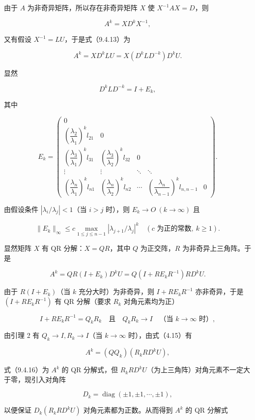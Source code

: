 由于 \(A\) 为非奇异矩阵，所以存在非奇异矩阵 \(X\) 使 \(X^{-1}AX=D\)，则

\[
A^k=XD^kX^{-1},
\tag{9.4.13}
\]

又有假设 \(X^{-1}=LU\)，于是式（9.4.13）为

\[
A^k=XD^kLU=X(D^kLD^{-k})D^kU.
\]

显然

\[
D^kLD^{-k}=I+E_k,
\]

其中

\[
E_k=\begin{pmatrix}
0&&&&\\
\left(\dfrac{\lambda_2}{\lambda_1}\right)^k l_{21}&0&&&\\
\left(\dfrac{\lambda_3}{\lambda_1}\right)^k l_{31}&\left(\dfrac{\lambda_3}{\lambda_2}\right)^k l_{32}&0&&\\
\vdots&\vdots&\ddots&\ddots&\\
\left(\dfrac{\lambda_n}{\lambda_1}\right)^k l_{n1}&\left(\dfrac{\lambda_n}{\lambda_2}\right)^k l_{n2}&\cdots&\left(\dfrac{\lambda_n}{\lambda_{n-1}}\right)^k l_{n,n-1}&0
\end{pmatrix}.
\]

由假设条件 \(|\lambda_i/\lambda_j|<1\)（当 \(i>j\) 时），则 \(E_k\to O\ (k\to\infty)\) 且

\[
\|E_k\|_\infty\leq c\max_{1\leq j\leq n-1}|\lambda_{j+1}/\lambda_j|^k
\quad(c\text{ 为正的常数},\ k\geq1).
\tag{9.4.14}
\]

显然矩阵 \(X\) 有 QR 分解：\(X=QR\)，其中 \(Q\) 为正交阵，\(R\) 为非奇异上三角阵。于是

\[
A^k=QR(I+E_k)D^kU=Q(I+RE_kR^{-1})RD^kU.
\tag{9.4.15}
\]

由于 \(R(I+E_k)\)（当 \(k\) 充分大时）为非奇异，则 \(I+RE_kR^{-1}\) 亦非奇异，于是 \((I+RE_kR^{-1})\) 有 QR 分解（要求 \(R_k\) 对角元素均为正）

\[
I+RE_kR^{-1}=Q_kR_k\quad\text{且}\quad Q_kR_k\to I\quad\text{（当 }k\to\infty\text{ 时）},
\]

由引理 2 有 \(Q_k\to I,R_k\to I\)（当 \(k\to\infty\) 时），由式（4.15）有

\[
A^k=(QQ_k)(R_kRD^kU),
\tag{9.4.16}
\]

式（9.4.16）为 \(A^k\) 的 QR 分解式，但 \(R_kRD^kU\)（为上三角阵）对角元素不一定大于零，现引入对角阵

\[
D_k=\operatorname{diag}(\pm1,\pm1,\cdots,\pm1),
\]

以便保证 \(D_k(R_kRD^kU)\) 对角元素都为正数。从而得到 \(A^k\) 的 QR 分解式

